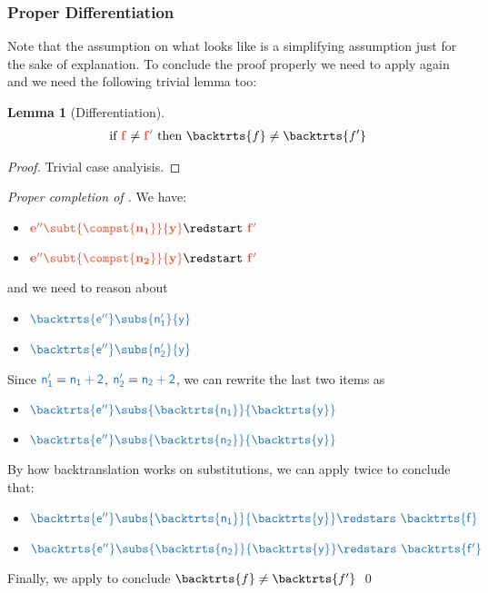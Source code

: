 \documentclass{article}
\newtheorem{lemma}[theorem]{Lemma}
\theoremstyle{definition}
\begin{document}
\subsubsection{Proper Differentiation}\label{sec:propdiff}
Note that the assumption on what  looks like is a simplifying assumption just for the sake of explanation.
To conclude the proof properly we need to apply again  and we need the following trivial lemma too:
\begin{lemma}[Differentiation]\label{thm:di}
	\begin{align*}
		\text{ if } \trg{f}\neq\trg{f'} \text{ then } \backtrts{f}\neq\backtrts{f'}
	\end{align*}
\end{lemma}
\begin{proof}
	Trivial case analyisis.
\end{proof}

\begin{proof}[Proper completion of ]
	We have:
	\begin{itemize}
		\item $\trg{{{e''}} \subt{\compst{n_1}}{y}} \redstart\ \trg{f'}$
		\item $\trg{{{e''}} \subt{\compst{n_2}}{y}} \redstart\ \trg{f'}$
	\end{itemize}
	and we need to reason about
	\begin{itemize}
		\item $\src{{\backtrts{e''}} \subs{n_1'}{y}}$
		\item $\src{{\backtrts{e''}} \subs{n_2'}{y}}$
	\end{itemize}
	Since $\src{n_1'} = \src{n_1+2}$, $\src{n_2'} = \src{n_2+2}$, we can rewrite the last two items as
	\begin{itemize}
		\item $\src{{\backtrts{e''}} \subs{\backtrts{n_1}}{\backtrts{y}}}$
		\item $\src{{\backtrts{e''}} \subs{\backtrts{n_2}}{\backtrts{y}}}$
	\end{itemize}
	By how backtranslation works on substitutions, we can apply  twice to conclude that:
	\begin{itemize}
		\item $\src{{\backtrts{e''}} \subs{\backtrts{n_1}}{\backtrts{y}} \redstars\ \backtrts{f}}$
		\item $\src{{\backtrts{e''}} \subs{\backtrts{n_2}}{\backtrts{y}} \redstars\ \backtrts{f'}}$
	\end{itemize}
	Finally, we apply  to conclude $\backtrts{f}\neq\backtrts{f'}$
	\qed
\end{proof}
\end{document}

